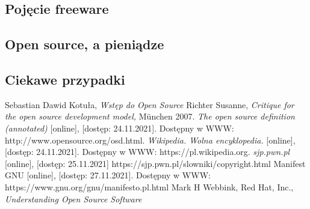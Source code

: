 \documentclass{article}
\begin{document}
\subsection{Pojęcie freeware}

\subsection{Open source, a pieniądze}

\subsection{Ciekawe przypadki}

\newpage
\begin{thebibliography}{99}
    Sebastian Dawid Kotuła,
    \emph{Wstęp do Open Source}
  Richter Susanne, \emph{Critique for the open source development model,} München 2007.
  \emph{The open source definition (annotated)} [online], [dostęp: 24.11.2021]. Dostępny w WWW: http://www.opensource.org/osd.html.
  \emph{Wikipedia. Wolna encyklopedia.} [online], [dostęp: 24.11.2021]. Dostępny w WWW: https://pl.wikipedia.org.
  \emph{sjp.pwn.pl} [online], [dostęp: 25.11.2021] https://sjp.pwn.pl/slowniki/copyright.html
  Manifest GNU [online], [dostęp: 27.11.2021]. Dostępny w WWW: https://www.gnu.org/gnu/manifesto.pl.html
  Mark H Webbink, Red Hat, Inc., \emph{Understanding Open Source Software}

\end{thebibliography}
\end{document}
